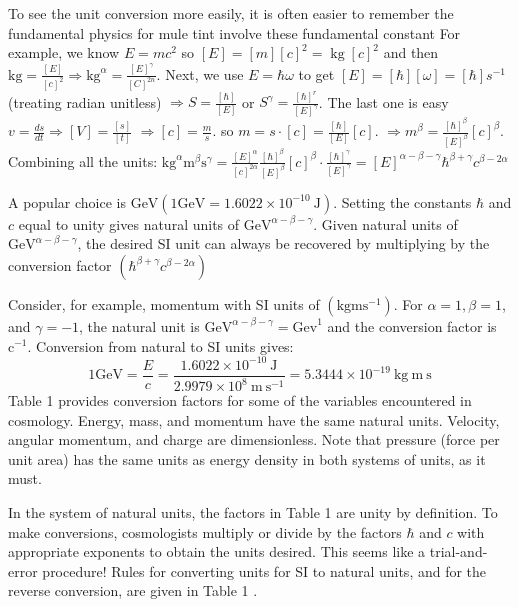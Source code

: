 \documentclass[main.tex]{subfiles}
\begin{document}
To see the unit conversion more easily, it is often easier to remember the fundamental physics for mule tint involve these fundamental constant For example, we know $E=m c^2$ so $[E]=[m][c]^2=\operatorname{kg}[c]^2$ and then $\mathrm{kg}=\frac{[E]}{[c]^2} \Rightarrow \mathrm{kg}^\alpha=\frac{[E]^\gamma}{[C]^{2 n}}$. Next, we use $E=\hbar \omega$ to get $[E]=[\hbar][\omega]=[\hbar] s^{-1}$ (treating radian unitless) $\Rightarrow S=\frac{[\hbar]}{[E]}$ or $S^\gamma=\frac{[\hbar]^r}{[E]^\gamma}$. The last one is easy $v=\frac{d s}{d t} \Rightarrow[V]=\frac{[s]}{[t]}$ $\Rightarrow[c]=\frac{m}{s}$. so $m=s \cdot[c]=\frac{[\hbar]}{[E]}[c]$. $\Rightarrow m^\beta=\frac{[\hbar]^\beta}{[E]^\beta}[c]^\beta$. Combining all the units: $\mathrm{kg}^\alpha \mathrm{m}^\beta \mathrm{s}^\gamma = \frac{[E]^\alpha}{[c]^{2 \alpha}} \frac{[\hbar]^\beta}{[E]^\beta}[c]^\beta \cdot \frac{[\hbar]^\gamma}{[E]^\gamma} = [E]^{\alpha-\beta-\gamma} \hbar^{\beta+\gamma} c^{\beta-2 \alpha}$



A popular choice is $\mathrm{GeV}\left(1 \mathrm{GeV}=1.6022 \times 10^{-10} \mathrm{~J}\right)$. Setting the constants $\hbar$ and $c$ equal to unity gives natural units of $\mathrm{GeV}^{\alpha-\beta-\gamma}$. Given natural units of $\mathrm{GeV}^{\alpha-\beta-\gamma}$, the desired SI unit can always be recovered by multiplying by the conversion factor $\left(\hbar^{\beta+\gamma} c^{\beta-2 \alpha}\right)$

Consider, for example, momentum with SI units of $\left(\mathrm{kg} \mathrm{m} \mathrm{s}^{-1}\right)$. For $\alpha=1, \beta=1$, and $\gamma=-1$, the natural unit is $\mathrm{GeV}^{\alpha-\beta-\gamma}=\mathrm{Gev}^1$ and the conversion factor is $\mathrm{c}^{-1}$. Conversion from natural to SI units gives:
$$
1 \mathrm{GeV}=\frac{E}{c}=\frac{1.6022 \times 10^{-10} \mathrm{~J}}{2.9979 \times 10^8 \mathrm{~m} \mathrm{~s}^{-1}}=5.3444 \times 10^{-19} \mathrm{~kg} \mathrm{~m} \mathrm{~s}
$$
Table 1 provides conversion factors for some of the variables encountered in cosmology. Energy, mass, and momentum have the same natural units. Velocity, angular momentum, and charge are dimensionless. Note that pressure (force per unit area) has the same units as energy density in both systems of units, as it must.

In the system of natural units, the factors in Table 1 are unity by definition. To make conversions, cosmologists multiply or divide by the factors $\hbar$ and $c$ with appropriate exponents to obtain the units desired. This seems like a trial-and-error procedure! Rules for converting units for SI to natural units, and for the reverse conversion, are given in Table 1 .
\end{document}
